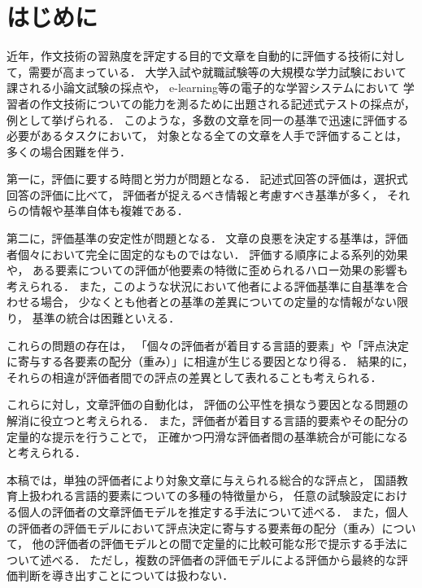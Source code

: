 \documentclass[japanese]{jnlp_1.5}
\begin{document}
\maketitle


\section{はじめに}

近年，作文技術の習熟度を評定する目的で文章を自動的に評価する技術に対して，需要が高まっている．
大学入試や就職試験等の大規模な学力試験において課される小論文試験の採点や，
e-learning等の電子的な学習システムにおいて
学習者の作文技術についての能力を測るために出題される記述式テストの採点が，例として挙げられる．
このような，多数の文章を同一の基準で迅速に評価する必要があるタスクにおいて，
対象となる全ての文章を人手で評価することは，多くの場合困難を伴う．

第一に，評価に要する時間と労力が問題となる．
記述式回答の評価は，選択式回答の評価に比べて，
評価者が捉えるべき情報と考慮すべき基準が多く，
それらの情報や基準自体も複雑である．

第二に，評価基準の安定性が問題となる．
文章の良悪を決定する基準は，評価者個々において完全に固定的なものではない．
評価する順序による系列的効果や，
ある要素についての評価が他要素の特徴に歪められるハロー効果\cite{NisbettWilson1977}の影響も考えられる．
また，このような状況において他者による評価基準に自基準を合わせる場合，
少なくとも他者との基準の差異についての定量的な情報がない限り，
基準の統合は困難といえる．

これらの問題の存在は，
「個々の評価者が着目する言語的要素」や「評点決定に寄与する各要素の配分（重み）」に相違が生じる要因となり得る．
結果的に，それらの相違が評価者間での評点の差異として表れることも考えられる．

これらに対し，文章評価の自動化は，
評価の公平性を損なう要因となる問題の解消に役立つと考えられる．
また，評価者が着目する言語的要素やその配分の定量的な提示を行うことで，
正確かつ円滑な評価者間の基準統合が可能になると考えられる．

本稿では，単独の評価者により対象文章に与えられる総合的な評点と，
国語教育上扱われる言語的要素についての多種の特徴量から，
任意の試験設定における個人の評価者の文章評価モデルを推定する手法について述べる．
また，個人の評価者の評価モデルにおいて評点決定に寄与する要素毎の配分（重み）について，
他の評価者の評価モデルとの間で定量的に比較可能な形で提示する手法について述べる．
ただし，複数の評価者の評価モデルによる評価から最終的な評価判断を導き出すことについては扱わない．
\end{document}
